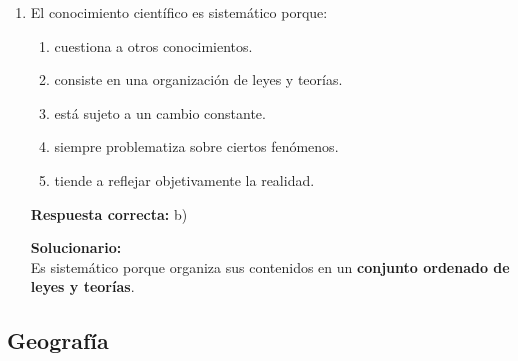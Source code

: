 \begin{enumerate}
	\vspace{2mm}
	\textbf{Solucionario:}\\
	Sustentar una tesis exige comprender, analizar, argumentar y explicar; eso corresponde al aprendizaje \textbf{cognitivo}.
	
	\vspace{6mm}
	
	\item El conocimiento científico es sistemático porque:
	
	\begin{enumerate}[label=\alph*)]
		\item cuestiona a otros conocimientos.
		\item consiste en una organización de leyes y teorías.
		\item está sujeto a un cambio constante.
		\item siempre problematiza sobre ciertos fenómenos.
		\item tiende a reflejar objetivamente la realidad.
	\end{enumerate}
	\textbf{Respuesta correcta:} b)
	
	\vspace{2mm}
	\textbf{Solucionario:}\\
	Es sistemático porque organiza sus contenidos en un \textbf{conjunto ordenado de leyes y teorías}.
	
	\vspace{6mm}
	
\end{enumerate}

\subsection*{Geografía}

